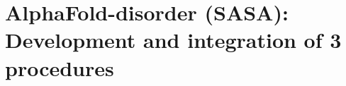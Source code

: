 \chapter{AlphaFold-disorder (SASA): Development and integration of 3 procedures}
\label{chp:development}